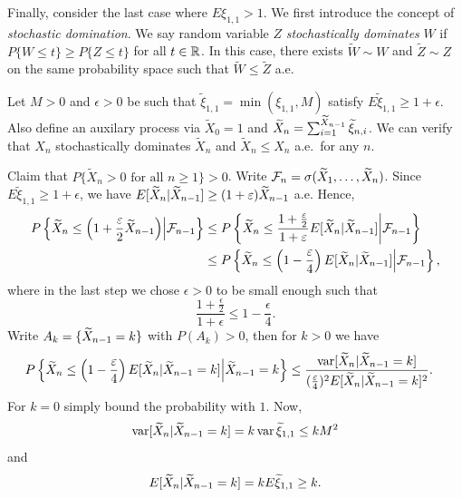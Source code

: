 \documentclass[a4paper]{article}
\begin{document}
\begin{eg}
  Finally, consider the last case where $E \xi_{1,1} > 1$.
  We first introduce the concept of \emph{stochastic domination}.
  We say random variable $Z$ \emph{stochastically dominates}
  $W$ if $P \{W \leq t\} \geq P \{Z \leq t\}$ for all $t \in \mathbb{R}$.
  In this case, there exists $\tilde{W} \sim W$ and $\tilde{Z} \sim Z$
  on the same probability space such that $\tilde{W} \leq \tilde{Z}$ a.e.

  Let $M > 0$ and $\epsilon > 0$ be such that $\tilde{\xi}_{1,1}
    = \min (\xi_{1,1}, M)$ satisfy $E \tilde{\xi}_{1,1} \geq 1 + \epsilon$.
  Also define an auxilary process via $\tilde{X}_0 = 1$
  and $\widetilde{X}_n = \sum_{i=1}^{\widetilde{X}_{n - 1}} \widetilde{\xi}_{n, i}$.
  We can verify that $X_n$ stochastically dominates
  $\tilde{X}_n$ and $\tilde{X}_n \leq X_n$ a.e.\ for any $n$.

  Claim that $P \{ \tilde{X}_n > 0 \text{ for all } n \geq 1 \} > 0$.
  Write $\mathcal{F}_n = \sigma (\widetilde{X}_1, \dots, \widetilde{X}_{n})$.
  Since $E \tilde{\xi}_{1,1} \geq 1 + \epsilon$, we have
  $E [\widetilde{X}_n | \widetilde{X}_{n - 1}] \geq (1 + \varepsilon) \widetilde{X}_{n - 1}$
  a.e. Hence,
  \begin{align*}
    P \left\{ \widetilde{X}_n \leq \left( 1 + \frac{\varepsilon}{2}
    \widetilde{X}_{n - 1} \right) \middle| \mathcal{F}_{n - 1} \right\}
     & \leq P \left\{ \widetilde{X}_n \leq \frac{1 + \frac{\varepsilon}{2}}
                                       {1 + \varepsilon} E [\widetilde{X}_n | \widetilde{X}_{n - 1}]
    \middle| \mathcal{F}_{n - 1} \right\}                                                 \\
     & \leq P \left\{ \widetilde{X}_n \leq \left( 1 - \frac{\varepsilon}{4} \right)
    E [\widetilde{X}_n | \widetilde{X}_{n - 1}] \middle| \mathcal{F}_{n - 1} \right\},
  \end{align*}
  where in the last step we chose $\epsilon > 0$ to be small
  enough such that
  \[
    \frac{1 + \frac{\epsilon}{2}}{1 + \epsilon} \leq 1 - \frac{\epsilon}{4}.
  \]
  Write $A_k = \{ \widetilde{X}_{n - 1} = k \}$ with $P(A_k) > 0$, then
  for $k > 0$ we have
  \begin{align*}
    P \left\{ \widetilde{X}_n \leq \left( 1 - \frac{\varepsilon}{4} \right)
    E [\widetilde{X}_n | \widetilde{X}_{n - 1} = k ] \middle| \widetilde{X}_{n - 1} = k \right\}
     & \leq \frac{\operatorname{var} [\widetilde{X}_n | \widetilde{X}_{n - 1} = k]}{(\frac{\varepsilon}{4})^2
              E[\widetilde{X}_n | \widetilde{X}_{n - 1} = k]^2}.
  \end{align*}
  For $k = 0$ simply bound the probability with $1$. Now,
  \[
    \operatorname{var} [\widetilde{X}_n | \widetilde{X}_{n - 1} = k]
    = k \operatorname{var} \widetilde{\xi}_{1,1} \leq k M^2
  \]
  and
  \[
    E [\widetilde{X}_n | \widetilde{X}_{n - 1} = k] = k E \widetilde{\xi}_{1,1}
    \geq k.
\]
\end{eg}
\end{document}
